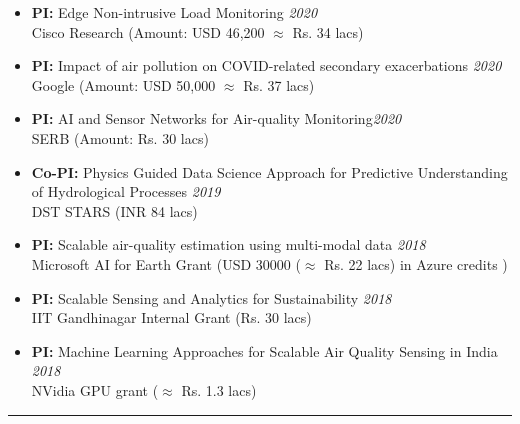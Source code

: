 \documentclass[letter,10pt]{article}
\begin{document}
\begin{itemize}
    \item[]{\textbf{PI: }Edge Non-intrusive Load Monitoring  }\hfill\textit{2020} \\
    Cisco Research (Amount: USD 46,200 $\approx$ Rs. 34 lacs)
    \item[]{\textbf{PI: }Impact of air pollution on COVID-related secondary exacerbations  }\hfill\textit{2020} \\
    Google (Amount: USD 50,000 $\approx$ Rs. 37 lacs)
    \ifcvshort\else
    \item[]{\textbf{PI: }AI and Sensor Networks for Air-quality Monitoring}\hfill\textit{2020} \\
    SERB (Amount: Rs. 30 lacs)
    
    \item[]{\textbf{Co-PI: }Physics Guided Data Science Approach for Predictive Understanding of Hydrological Processes }\hfill\textit{2019}\\
    DST STARS (INR 84 lacs)
    \item[]{\textbf{PI: }Scalable air-quality estimation using multi-modal data \hfill\textit{2018}\\Microsoft AI for Earth Grant (USD 30000 ($\approx$ Rs. 22 lacs) in Azure credits )} 
    \item[]{\textbf{PI: }Scalable Sensing and Analytics for Sustainability \hfill\textit{2018} \\
    IIT Gandhinagar Internal Grant (Rs. 30 lacs)} 
    \item[]{\textbf{PI: }Machine Learning Approaches for Scalable Air Quality Sensing in India} \hfill\textit{2018}\\
    NVidia GPU grant ($\approx$ Rs. 1.3 lacs)
    \fi
\end{itemize}

\ifcvshort\else
\vspace{0.5em}
\noindent\rule{\textwidth}{0.5pt}
\vspace{-0.2em}
\fi
\end{document}
